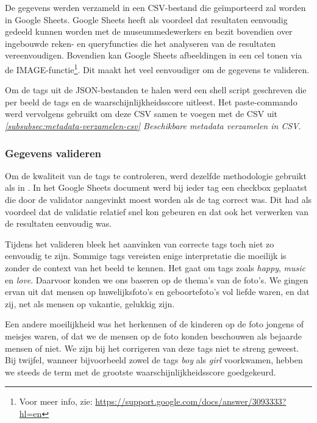 De gegevens werden verzameld in een CSV-bestand die geïmporteerd zal worden in Google Sheets. Google Sheets heeft als voordeel dat resultaten eenvoudig gedeeld kunnen worden met de museummedewerkers en bezit bovendien over ingebouwde reken- en queryfuncties die het analyseren van de resultaten vereenvoudigen. Bovendien kan Google Sheets afbeeldingen in een cel tonen via de IMAGE-functie\footnote{Voor meer info, zie: \url{https://support.google.com/docs/answer/3093333?hl=en}}. Dit maakt het veel eenvoudiger om de gegevens te valideren.

Om de tags uit de JSON-bestanden te halen werd een shell script geschreven die per beeld de tags en de waarschijnlijkheidsscore uitleest. Het paste-commando werd vervolgens gebruikt om deze CSV samen te voegen met de CSV uit \textit{\ref{subsubsec:metadata-verzamelen-csv} Beschikbare metadata verzamelen in CSV}.


\subsubsection{Gegevens valideren}

Om de kwaliteit van de tags te controleren, werd dezelfde methodologie gebruikt als in \textcite{Vanstappen2019}. In het Google Sheets document werd bij ieder tag een checkbox geplaatst die door de validator aangevinkt moest worden als de tag correct was. Dit had als voordeel dat de validatie relatief snel kon gebeuren en dat ook het verwerken van de resultaten eenvoudig was. 

Tijdens het valideren bleek het aanvinken van correcte tags toch niet zo eenvoudig te zijn. Sommige tags vereisten enige interpretatie die moeilijk is zonder de context van het beeld te kennen. Het gaat om tags zoals \textit{happy}, \textit{music} en \textit{love}. Daarvoor konden we ons baseren op de thema’s van de foto’s. We gingen ervan uit dat mensen op huwelijksfoto’s en geboortefoto’s vol liefde waren, en dat zij, net als mensen op vakantie, gelukkig zijn. 

Een andere moeilijkheid was het herkennen of de kinderen op de foto jongens of meisjes waren, of dat we de mensen op de foto konden beschouwen als bejaarde mensen of niet. We zijn bij het corrigeren van deze tags niet te streng geweest. Bij twijfel, wanneer bijvoorbeeld zowel de tags \textit{boy} als \textit{girl} voorkwamen, hebben we steeds de term met de grootste waarschijnlijkheidsscore goedgekeurd.

